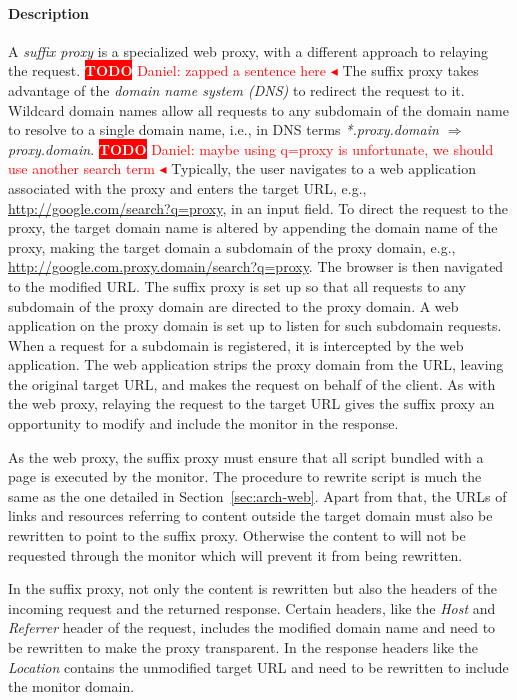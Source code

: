 \documentclass{llncs}
\newcommand{\todo}[1]{\colorbox{red}{\textcolor{white}{\sffamily\bfseries\scriptsize TODO}} \textcolor{red}{#1} \textcolor{red}{$\blacktriangleleft$}}
\begin{document}
\paragraph{Description}
A \emph{suffix proxy} is a specialized web proxy, with a different approach to relaying the request. 
\todo{Daniel: zapped a sentence here}
The suffix proxy takes advantage of the \emph{domain name system (DNS)} to redirect the request to it.
Wildcard domain names allow all requests to any subdomain of the domain name to resolve to a single domain name, 
i.e., in DNS terms \emph{*.proxy.domain $\Rightarrow$ proxy.domain}.
\todo{Daniel: maybe using q=proxy is unfortunate, we should use another search term}
Typically, the user navigates to a 
web application associated with the proxy and enters the target URL, e.g., \url{http://google.com/search?q=proxy}, in 
an input field. To direct the request to the proxy, the target domain name is altered
by appending the domain name of the proxy, making the target domain a subdomain of the proxy domain, e.g., \url{http://google.com.proxy.domain/search?q=proxy}. 
The browser is then navigated to the modified URL.
The suffix proxy is set up so
that all requests to any subdomain of the proxy domain are directed to the proxy domain. 
A web application on the proxy domain is set up to listen for such subdomain requests.
When a request for a subdomain is registered, it is intercepted by the web application.
The web application strips the proxy domain from the URL, leaving the original target URL, 
and makes the request on behalf of the client. As with the web proxy, 
relaying the request to the target URL gives the suffix proxy an opportunity to modify and 
include the monitor in the response.

As the web proxy, the suffix proxy must ensure that all script bundled with a 
page is executed by the monitor. The procedure to rewrite script is much the same as the one
detailed in Section~\ref{sec:arch-web}. Apart from that, the URLs of links and 
resources referring to content outside the target domain must also be rewritten to point to the suffix proxy. 
Otherwise the content to will not be requested through the monitor which will 
prevent it from being rewritten.


In the suffix proxy, not only the content is rewritten
but also the headers of the incoming request and the returned response.
Certain headers, like the \emph{Host} and \emph{Referrer} header of the request, includes the 
modified domain name and need to be rewritten to make the proxy transparent. In 
the response headers like the \emph{Location} contains the unmodified target URL and 
need to be rewritten to include the monitor domain. 
\end{document}
